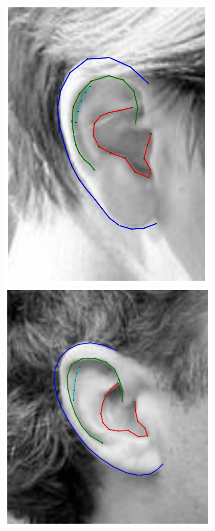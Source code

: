 \begin{figure}[!t]
    \includegraphics[height=\flowhh]{resources/Ear_Deformable_Model/fittings/final_0023}
    \includegraphics[height=\flowhh]{resources/Ear_Deformable_Model/fittings/final_0015}

\end{figure}

